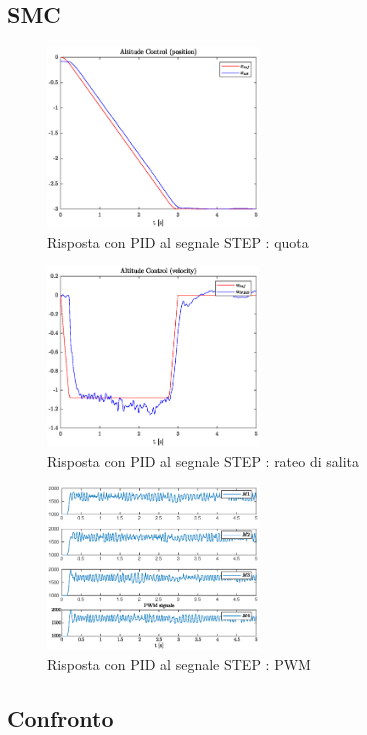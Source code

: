 \clearpage
\subsection{SMC}

\begin{figure}
	\centering
	\includegraphics[width=0.5\textwidth]{Simulazioni/Figure/STEPaltitudecontrolposSMC}
	\caption{Risposta con PID al segnale STEP : quota}
\end{figure}

\begin{figure}
	\centering
	\includegraphics[width=0.5\textwidth]{Simulazioni/Figure/STEPaltitudecontrolvelSMC}
	\caption{Risposta con PID al segnale STEP : rateo di salita}
\end{figure}

\begin{figure}
	\centering
	\includegraphics[width=0.5\textwidth]{Simulazioni/Figure/STEPpwmSMC}
	\caption{Risposta con PID al segnale STEP : PWM}
\end{figure}

\clearpage
\subsection{Confronto}